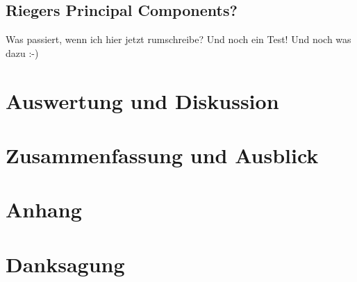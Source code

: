 \documentclass[12pt,a4paper,onecolumn]{scrartcl}
\begin{document}
\subsection{Riegers Principal Components?}
Was passiert, wenn ich hier jetzt rumschreibe? Und noch ein Test! Und noch was dazu :-)

\section{Auswertung und Diskussion}
\section{Zusammenfassung und Ausblick}
\newpage  
\printbibliography
\newpage
\appendix
\section{Anhang}
\listoffigures
{}
\listoftables
\section{Danksagung}
\end{document}
